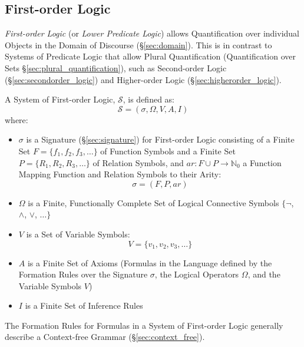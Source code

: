 \subsection{First-order Logic}\label{sec:firstorder_logic}

\emph{First-order Logic} (or \emph{Lower Predicate Logic}) allows
Quantification over individual Objects in the Domain of Discourse
(\S\ref{sec:domain}). This is in contrast to Systems of Predicate
Logic that allow Plural Quantification (Quantification over Sets
\S\ref{sec:plural_quantification}), such as Second-order Logic
(\S\ref{sec:secondorder_logic}) and Higher-order Logic
(\S\ref{sec:higherorder_logic}).

A System of First-order Logic, $\mathcal{S}$, is defined as:
\[
  \mathcal{S} = (\sigma,\Omega,V,A,I)
\]
where:
\begin{itemize}
  \item $\sigma$ is a Signature (\S\ref{sec:signature}) for
    First-order Logic consisting of a Finite Set $F = \{f_1, f_2, f_3,
    \ldots \}$ of Function Symbols and a Finite Set $P = \{ R_1, R_2,
    R_3, \ldots\}$ of Relation Symbols, and $ar : F \cup P \rightarrow
    \mathbb{N}_0$ a Function Mapping Function and Relation Symbols to
    their Arity:
    \[\sigma = (F,P,ar)\]
  \item $\Omega$ is a Finite, Functionally Complete Set of Logical
    Connective Symbols $\{\neg$, $\wedge$, $\vee$, $\ldots\}$
  \item $V$ is a Set of Variable Symbols:
    \[V = \{v_1, v_2, v_3, \ldots\}\]
  \item $A$ is a Finite Set of Axioms (Formulas in the Language
    defined by the Formation Rules over the Signature $\sigma$, the
    Logical Operators $\Omega$, and the Variable Symbols $V$)
  \item $I$ is a Finite Set of Inference Rules
\end{itemize}

The Formation Rules for Formulas in a System of First-order Logic
generally describe a Context-free Grammar (\S\ref{sec:context_free}).

